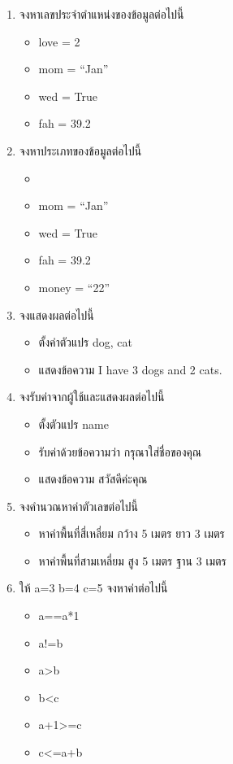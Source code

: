 \begin{enumerate} 
\item จงหาเลขประจำตำแหน่งของข้อมูลต่อไปนี้
\begin{itemize}
\item love = 2
\item mom = “Jan”
\item wed = True
\item fah = 39.2 
\end{itemize}

\item จงหาประเภทของข้อมูลต่อไปนี้
\begin{itemize}
\item {}
\item mom = “Jan”
\item wed = True
\item fah = 39.2 
\item money = “22”
\end{itemize}

\item จงแสดงผลต่อไปนี้
\begin{itemize}
\item ตั้งค่าตัวแปร dog, cat
\item แสดงข้อความ I have 3 dogs and 2 cats.
\end{itemize}

\item จงรับค่าจากผู้ใช้และแสดงผลต่อไปนี้
\begin{itemize}
\item ตั้งตัวแปร name 
\item รับค่าด้วยข้อความว่า กรุณาใส่ชื่อของคุณ
\item แสดงข้อความ สวัสดีค่ะคุณ
\end{itemize}



\item จงคำนวณหาค่าตัวเลขต่อไปนี้
\begin{itemize}
\item หาค่าพื้นที่สี่เหลี่ยม กว้าง 5 เมตร ยาว 3 เมตร
\item หาค่าพื้นที่สามเหลี่ยม สูง 5 เมตร ฐาน 3 เมตร
\end{itemize}


\item ให้ a=3 b=4 c=5 จงหาค่าต่อไปนี้
\begin{itemize}
\item a==a*1
\item a!=b
\item a>b
\item b<c
\item a+1>=c
\item c<=a+b

\end{itemize}
\end{enumerate}








